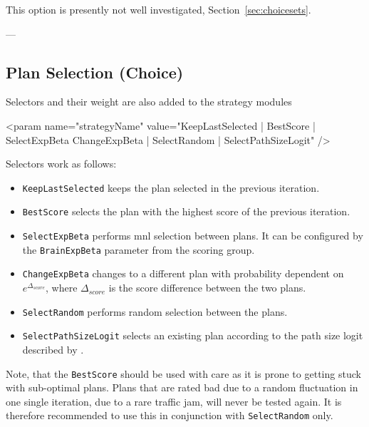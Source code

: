 This option is presently not well investigated, \cf Section~\ref{sec:choicesets}.

---

 



\subsection{Plan Selection (Choice)}
\label{sec:selectors}
Selectors and their weight are also added to the strategy modules
%
\begin{xml}
	<param name="strategyName" value="KeepLastSelected | BestScore | SelectExpBeta
					ChangeExpBeta | SelectRandom | SelectPathSizeLogit" />
\end{xml}
%
Selectors work as follows:
%
\begin{itemize}\styleItemize
	\item \lstinline|KeepLastSelected| keeps the plan selected in the previous iteration.
	\item \lstinline|BestScore| selects the plan with the highest score of the previous iteration.
	\item \lstinline|SelectExpBeta| performs \gls{mnl} selection between plans. It can be configured by the \lstinline|BrainExpBeta| parameter from the scoring group.
	\item \lstinline|ChangeExpBeta| changes to a different plan with probability dependent on $e^{\Delta_{score}}$, where $\Delta_{score}$ is the score difference between the two plans.
	\item \lstinline|SelectRandom| performs random selection between the plans.
	\item \lstinline|SelectPathSizeLogit| selects an existing plan according to the path size logit described by \citet[][]{FrejingerBierlaire_TransResB_2007}.
\end{itemize}
%
Note, that the \lstinline|BestScore| should be used with care as it is prone to getting stuck with sub-optimal plans. Plans that are rated bad due to a random fluctuation in one single iteration, due to \eg a rare traffic jam, will never be tested again. It is therefore recommended to use this in conjunction with \lstinline|SelectRandom| only.

